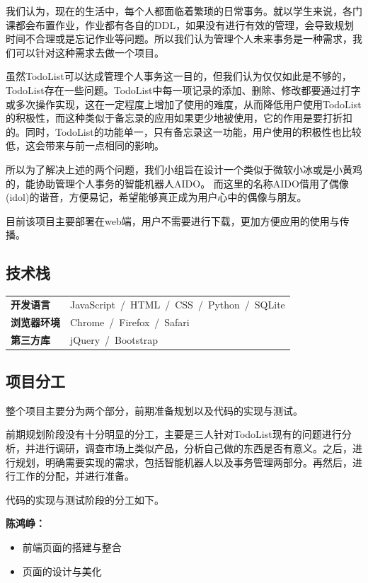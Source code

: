 \documentclass[logo,reportComp]{thesis}
\begin{document}
我们认为，现在的生活中，每个人都面临着繁琐的日常事务。就以学生来说，各门课都会布置作业，作业都有各自的DDL，如果没有进行有效的管理，会导致规划时间不合理或是忘记作业等问题。所以我们认为管理个人未来事务是一种需求，我们可以针对这种需求去做一个项目。

虽然TodoList可以达成管理个人事务这一目的，但我们认为仅仅如此是不够的，TodoList存在一些问题。TodoList中每一项记录的添加、删除、修改都要通过打字或多次操作实现，这在一定程度上增加了使用的难度，从而降低用户使用TodoList的积极性，而这种类似于备忘录的应用如果更少地被使用，它的作用是要打折扣的。同时，TodoList的功能单一，只有备忘录这一功能，用户使用的积极性也比较低，这会带来与前一点相同的影响。

所以为了解决上述的两个问题，我们小组旨在设计一个类似于微软小冰或是小黄鸡的，能协助管理个人事务的智能机器人AIDO。
而这里的名称AIDO借用了偶像(idol)的谐音，方便易记，希望能够真正成为用户心中的偶像与朋友。

目前该项目主要部署在web端，用户不需要进行下载，更加方便应用的使用与传播。

\subsection{技术栈} %
\begin{flushleft}
\begin{tabular}{ll}
\textbf{开发语言} &\qquad JavaScript\ /\ HTML\ /\ CSS\ /\ Python\ /\ SQLite\\
\textbf{浏览器环境} &\qquad Chrome\ /\ Firefox\ /\ Safari\\
\textbf{第三方库}  &\qquad jQuery\ /\ Bootstrap
\end{tabular}
\end{flushleft}

\subsection{项目分工}
整个项目主要分为两个部分，前期准备规划以及代码的实现与测试。

前期规划阶段没有十分明显的分工，主要是三人针对TodoList现有的问题进行分析，并进行调研，调查市场上类似产品，分析自己做的东西是否有意义。之后，进行规划，明确需要实现的需求，包括智能机器人以及事务管理两部分。再然后，进行工作的分配，并进行准备。

代码的实现与测试阶段的分工如下。

\textbf{陈鸿峥：}
\begin{itemize}
\item 前端页面的搭建与整合
\item 页面的设计与美化
\end{itemize}
\end{document}
